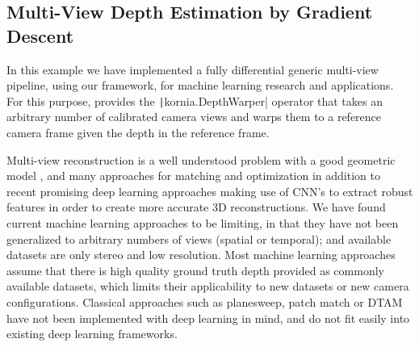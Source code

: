 \label{section:use_cases:depth_estimation}
\subsection{Multi-View Depth Estimation by Gradient Descent}
%
In this example we have implemented a fully differential generic multi-view pipeline, using our framework,  for machine learning research and applications. For this purpose, \lib{} provides the \texttt|kornia.DepthWarper| operator that takes an arbitrary number of calibrated camera views and warps them to a reference camera frame given the depth in the reference frame.

Multi-view reconstruction is a well understood problem with a good geometric model \citep{Hartley_MVG}, and many approaches for matching and optimization \citep{dtam_Newcombe2011, patchmatch-stereo, Sevilla-LaraSJB16} in addition to recent promising deep learning approaches \citep{Luo2016} making use of CNN's to extract robust features in order to create more accurate 3D reconstructions. We have found current machine learning approaches \citep{FischerDIHHGSCB15, IlgMSKDB16} to be limiting, in that they have not been generalized to arbitrary numbers of views (spatial or temporal); and available datasets \citep{Butler2012, Geiger2012CVPR} are only stereo and low resolution. Most machine learning approaches assume that there is high quality ground truth depth provided as commonly available datasets, which limits
their applicability to new datasets or new camera configurations. Classical approaches such as planesweep, patch match or DTAM~\citep{Newcombe:2011:DDT:2355573.2356447} have not been implemented with deep learning in mind, and do not fit easily into existing deep learning frameworks.\\

